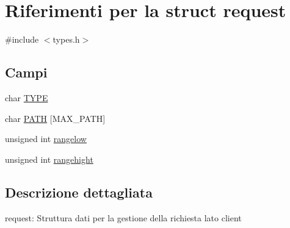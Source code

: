\hypertarget{structrequest}{
\section{Riferimenti per la struct request}
\label{structrequest}
}


{\ttfamily \#include $<$types.h$>$}

\subsection*{Campi}
{\bf }\par
\begin{DoxyCompactItemize}
\item 
char \hyperlink{structrequest_ac447850484fbd4c1c9452883f3d19a29}{TYPE}
\item 
char \hyperlink{structrequest_a57b4438b836ceeb60da037e42ae402a2}{PATH} \mbox{[}MAX\_\-PATH\mbox{]}
\item 
unsigned int \hyperlink{structrequest_ac8e95bcd354032facb72350865d93654}{rangelow}
\item 
unsigned int \hyperlink{structrequest_a0b27c2650c7ee47d638b89d1398177fc}{rangehight}
\end{DoxyCompactItemize}



\subsection{Descrizione dettagliata}
request: Struttura dati per la gestione della richiesta lato client 

